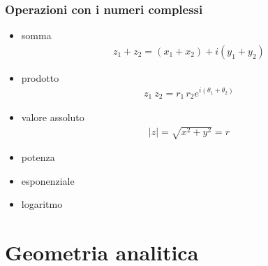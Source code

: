 \documentclass[letterpaper,10pt,english]{jupyterBook}
\begin{document}
\section{Operazioni con i numeri complessi}
\label{\detokenize{ch/algebra/complex-algebra:operazioni-con-i-numeri-complessi}}\begin{itemize}
\item {} 
\sphinxAtStartPar
somma
\begin{equation*}
\begin{split}z_1 + z_2 = (x_1 + x_2) + i(y_1 + y_2)\end{split}
\end{equation*}
\item {} 
\sphinxAtStartPar
prodotto
\begin{equation*}
\begin{split}z_1 \ z_2 = r_1 \, r_2 e^{i(\theta_1 + \theta_2)}\end{split}
\end{equation*}
\item {} 
\sphinxAtStartPar
valore assoluto
\begin{equation*}
\begin{split}|z| = \sqrt{x^2 + y^2} = r\end{split}
\end{equation*}
\item {} 
\sphinxAtStartPar
potenza

\item {} 
\sphinxAtStartPar
esponenziale

\item {} 
\sphinxAtStartPar
logaritmo

\end{itemize}

\sphinxstepscope


\part{Geometria analitica}

\sphinxstepscope
\end{document}
